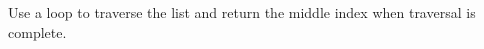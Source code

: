 \documentclass[preview]{standalone}
\begin{document}
Use a loop to traverse the list and return the middle index when traversal is complete.\\
\end{document}
